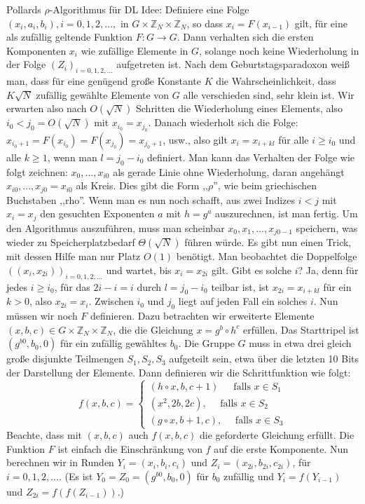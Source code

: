 \documentclass[a4paper]{article}
\begin{document}
\begin{multicols}{3}
        Pollards ${\rho}$-Algorithmus für DL
        Idee: Definiere eine Folge $(x_i,a_i,b_i),i= 0,1,2,...,$ in $G\times\mathbb{Z}_N\times\mathbb{Z}_N$, so dass $x_i=F(x_{i-1})$ gilt, für eine als zufällig geltende Funktion $F:G\rightarrow G$. Dann verhalten sich die ersten Komponenten $x_i$ wie zufällige Elemente in $G$, solange noch keine Wiederholung in der Folge $(Z_i)_{i=0, 1 , 2 ,...}$ aufgetreten ist. Nach dem Geburtstagsparadoxon weiß man, dass für eine genügend große Konstante $K$ die Wahrscheinlichkeit, dass $K\sqrt{N}$ zufällig gewählte Elemente von $G$ alle verschieden sind, sehr klein ist. Wir erwarten also nach $O(\sqrt{N})$ Schritten die Wiederholung eines Elements, also $i_0< j_0=O(\sqrt{N})$ mit $x_{i_0}= x_{j_0}$. Danach wiederholt sich die Folge: $x_{i_0 +1}= F(x_{i_0}) =F(x_{j_0}) = x_{j_0 +1}$, usw., also gilt $x_i=x_{i+kl}$ für alle $i\geq i_0$ und alle $k\geq 1$, wenn man $l=j_0 -i_0$ definiert. Man kann das Verhalten der Folge wie folgt zeichnen: $x_0,...,x_{i0}$ als gerade Linie ohne Wiederholung, daran angehängt $x_{i0},...,x_{j0}=x_{i0}$ als Kreis. Dies gibt die Form ,,${\rho}$'', wie beim griechischen Buchstaben ,,rho''. Wenn man es nun noch schafft, aus zwei Indizes $i < j$ mit $x_i=x_j$ den gesuchten Exponenten $a$ mit $h=g^a$ auszurechnen, ist man fertig.
        Um den Algorithmus auszuführen, muss man scheinbar $x_0,x_1,...,x_{j0-1}$ speichern, was wieder zu Speicherplatzbedarf $\Theta (\sqrt{N})$ führen würde. Es gibt nun einen Trick, mit dessen Hilfe man nur Platz $O(1)$ benötigt. Man beobachtet die Doppelfolge $((x_i,x_{2i}))_{i=0, 1 , 2 ,...}$ und wartet, bis $x_i= x_{2i}$ gilt. Gibt es solche $i$? Ja, denn für jedes $i\geq i_0$, für das $2i-i=i$ durch $l=j_0-i_0$ teilbar ist, ist $x_{2i}=x_{i+kl}$ für ein $k>0$, also $x_{2i}=x_i$. Zwischen $i_0$ und $j_0$ liegt auf jeden Fall ein solches $i$. Nun müssen wir noch $F$ definieren. Dazu betrachten wir erweiterte Elemente $(x,b,c)\in G\times\mathbb{Z}_N \times\mathbb{Z}_N$, die die Gleichung $x=g^b \circ h^c$ erfüllen. Das Starttripel ist $(g^{b0},b_0,0)$ für ein zufällig gewähltes $b_0$. Die Gruppe $G$ muss in etwa drei gleich große disjunkte Teilmengen $S_1,S_2,S_3$ aufgeteilt sein, etwa über die letzten 10 Bits der Darstellung der Elemente. Dann definieren wir die Schrittfunktion wie folgt:
    $$f(x,b,c) =\begin{cases} (h\circ x,b,c+1)\,\quad\text{ falls }x\in S_1\\ (x^2, 2b, 2c),\quad\text{ falls }x\in S_2\\ (g\circ x,b+1,c),\quad\text{ falls } x\in S_3 \end{cases}$$
    Beachte, dass mit $(x,b,c)$ auch $f(x,b,c)$ die geforderte Gleichung erfüllt. Die Funktion $F$ ist einfach die Einschränkung von $f$ auf die erste Komponente.
    Nun berechnen wir in Runden $Y_i= (x_i,b_i,c_i)$ und $Z_i= (x_{2i},b_{2i},c_{2i})$, für $i=0,1,2,....$ (Es ist $Y_0=Z_0=(g^{b0},b_0,0)$ für $b_0$ zufällig und $Y_i=f(Y_{i-1})$ und $Z_{2i}=f(f(Z_{i-1}))$.)


\end{multicols}
\end{document}
